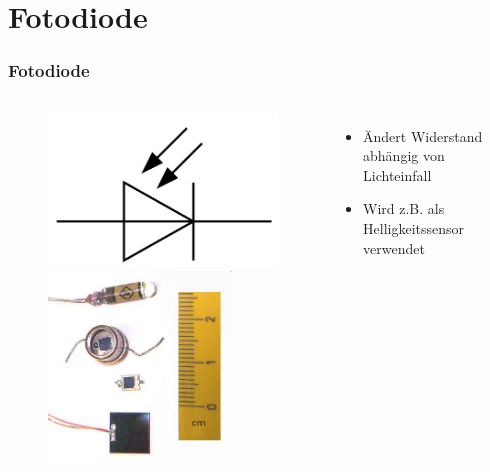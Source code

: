 \section*{Fotodiode}
\begin{frame}
    \frametitle{Fotodiode}
    \begin{columns}[c]
        \column[c]{5cm}
        \begin{center}
	\begin{figure}
            \includegraphics[width=.8\textwidth, height=.2\textheight, keepaspectratio]{e12/Symbol_Photodiode.png}\\
            \includegraphics[width=0.8\textwidth,height=.4\textheight, keepaspectratio]{e12/Fotodio.jpg}
	\end{figure}
        \end{center}
        \column{5cm}
    \begin{itemize}
			\item Ändert Widerstand abhängig von Lichteinfall 
			\item Wird z.B. als Helligkeitssensor verwendet
	\end{itemize}
    \end{columns}
\end{frame}

